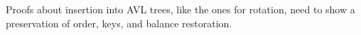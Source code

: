 Proofs about insertion into AVL trees, like the ones for rotation, need to show a preservation of order, keys, and balance restoration.